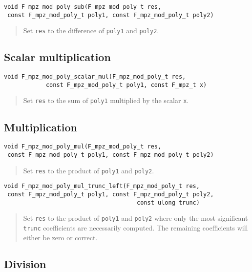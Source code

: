\documentclass[a4paper,10pt]{article}
\newcommand{\code}{\lstinline}
\begin{document}
\begin{lstlisting}
void F_mpz_mod_poly_sub(F_mpz_mod_poly_t res, 
 const F_mpz_mod_poly_t poly1, const F_mpz_mod_poly_t poly2)
\end{lstlisting}
\begin{quote}
Set \code{res} to the difference of \code{poly1} and \code{poly2}.
\end{quote}

\subsection{Scalar multiplication}

\begin{lstlisting}
void F_mpz_mod_poly_scalar_mul(F_mpz_mod_poly_t res, 
            const F_mpz_mod_poly_t poly1, const F_mpz_t x)
\end{lstlisting}
\begin{quote}
Set \code{res} to the sum of \code{poly1} multiplied by the scalar \code{x}.
\end{quote}

\subsection{Multiplication}

\begin{lstlisting}
void F_mpz_mod_poly_mul(F_mpz_mod_poly_t res, 
 const F_mpz_mod_poly_t poly1, const F_mpz_mod_poly_t poly2)
\end{lstlisting}
\begin{quote}
Set \code{res} to the product of \code{poly1} and \code{poly2}.
\end{quote}

\begin{lstlisting}
void F_mpz_mod_poly_mul_trunc_left(F_mpz_mod_poly_t res, 
 const F_mpz_mod_poly_t poly1, const F_mpz_mod_poly_t poly2, 
                                      const ulong trunc)
\end{lstlisting}
\begin{quote}
Set \code{res} to the product of \code{poly1} and \code{poly2} where only the most significant \code{trunc}
coefficients are necessarily computed. The remaining coefficients will either be zero or correct.
\end{quote}

\subsection{Division}
\end{document}
